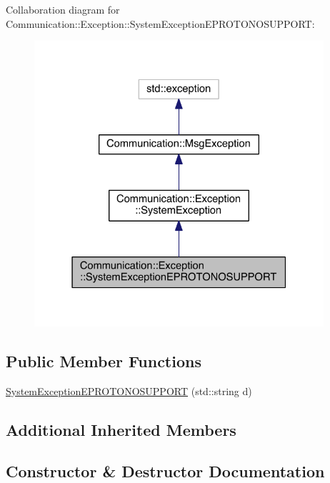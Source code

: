 Collaboration diagram for Communication\+:\+:Exception\+:\+:System\+Exception\+E\+P\+R\+O\+T\+O\+N\+O\+S\+U\+P\+P\+O\+R\+T\+:\nopagebreak
\begin{figure}[H]
\begin{center}
\leavevmode
\includegraphics[width=304pt]{class_communication_1_1_exception_1_1_system_exception_e_p_r_o_t_o_n_o_s_u_p_p_o_r_t__coll__graph}
\end{center}
\end{figure}
\subsection*{Public Member Functions}
\begin{DoxyCompactItemize}
\item 
\hyperlink{class_communication_1_1_exception_1_1_system_exception_e_p_r_o_t_o_n_o_s_u_p_p_o_r_t_aef294ed036c4e59ae051eade20fc11f6}{System\+Exception\+E\+P\+R\+O\+T\+O\+N\+O\+S\+U\+P\+P\+O\+R\+T} (std\+::string d)
\end{DoxyCompactItemize}
\subsection*{Additional Inherited Members}


\subsection{Constructor \& Destructor Documentation}
\hypertarget{class_communication_1_1_exception_1_1_system_exception_e_p_r_o_t_o_n_o_s_u_p_p_o_r_t_aef294ed036c4e59ae051eade20fc11f6}{}

